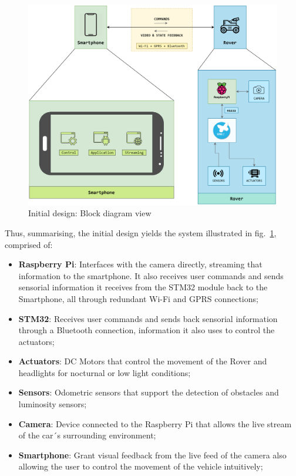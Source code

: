 \begin{figure}[!ht]
\centering
\includegraphics[width=1.0\textwidth]{./sec/img/initial_design_diagram.png}
\caption{\label{fig:initial-design}Initial design: Block diagram view}
\end{figure}

Thus, summarising, the initial design yields the system illustrated in
fig.~\ref{fig:initial-design}, comprised of:

\begin{itemize}
\item \textbf{ Raspberry Pi}: Interfaces with the camera directly, streaming that information to the smartphone. It also receives user commands and sends sensorial information it receives from the STM32 module back to the Smartphone, all through redundant Wi-Fi and GPRS connections;
\item \textbf{STM32}: Receives user commands and sends back sensorial information through a Bluetooth connection, information it also uses to control the actuators;
\item \textbf{Actuators}: DC Motors that control the movement of the Rover and headlights for nocturnal or low light conditions;
\item \textbf{Sensors}: Odometric sensors that support the detection of obstacles and luminosity sensors;
\item \textbf{Camera}: Device connected to the Raspberry Pi that allows the live stream of the car´s surrounding environment;
\item \textbf{Smartphone}: Grant visual feedback from the live feed of the camera also allowing the user to control the movement of the vehicle intuitively;
\end{itemize}

